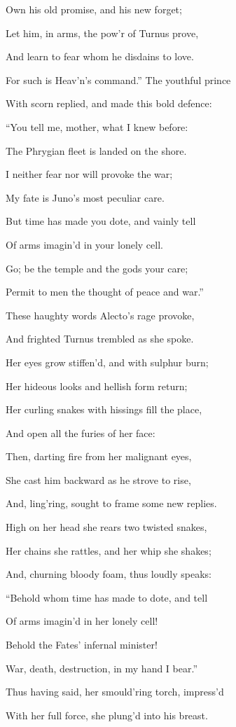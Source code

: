 Own his old promise, and his new forget;

Let him, in arms, the pow’r of Turnus prove,

And learn to fear whom he disdains to love.

For such is Heav’n’s command.” The youthful prince

With scorn replied, and made this bold defence:

“You tell me, mother, what I knew before:

The Phrygian fleet is landed on the shore.

I neither fear nor will provoke the war;

My fate is Juno’s most peculiar care.

But time has made you dote, and vainly tell

Of arms imagin’d in your lonely cell.

Go; be the temple and the gods your care;

Permit to men the thought of peace and war.”

These haughty words Alecto’s rage provoke,

And frighted Turnus trembled as she spoke.

Her eyes grow stiffen’d, and with sulphur burn;

Her hideous looks and hellish form return;

Her curling snakes with hissings fill the place,

And open all the furies of her face:

Then, darting fire from her malignant eyes,

She cast him backward as he strove to rise,

And, ling’ring, sought to frame some new replies.

High on her head she rears two twisted snakes,

Her chains she rattles, and her whip she shakes;

And, churning bloody foam, thus loudly speaks:

“Behold whom time has made to dote, and tell

Of arms imagin’d in her lonely cell!

Behold the Fates’ infernal minister!

War, death, destruction, in my hand I bear.”

Thus having said, her smould’ring torch, impress’d

With her full force, she plung’d into his breast.

